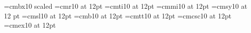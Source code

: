 %
%
%
%
%
%
%
\font\bigbold=cmbx10 scaled 
\font\twelverm=cmr10 at 12pt		%
\font\twelveit=cmti10 at 12pt		%
\font\twelvei=cmmi10 at 12pt		%
\font\twelvesy=cmsy10 at 12 pt		%
\font\twelvesl=cmsl10 at 12pt		%
\font\twelvebf=cmb10 at 12pt		%
\font\twelvett=cmtt10 at 12pt		%
\font\twelvesmc=cmcsc10 at 12pt		%
\font\twelveex=cmex10 at 12pt		%
